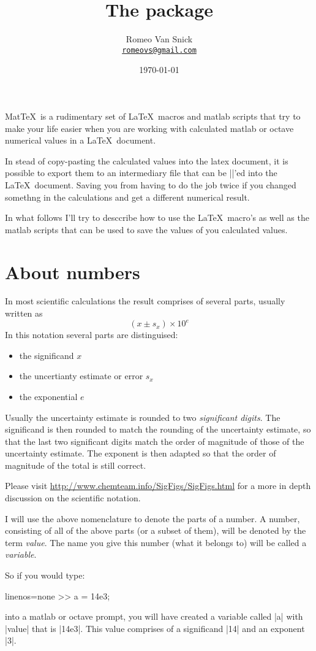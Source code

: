 \documentclass[a4paper,10pt]{article}
\author{Romeo Van Snick\\
\href{mailto:romeovs@gmail.com}{\nolinkurl{romeovs@gmail.com}}}
\date{\today}
\title{The \mt package}
\newcommand{\mt}{Mat\TeX\ }
\begin{document}
\maketitle

\mt is a rudimentary set of \LaTeX\ macros and matlab scripts that try to make your life easier when you are working with calculated matlab or octave numerical values in a \LaTeX\ document.

In stead of copy-pasting the calculated values into the latex document, it is possible to export them to an intermediary file that can be ||'ed into the \LaTeX\ document. Saving you from having to do the job twice if you changed somethng in the calculations and get a different numerical result.

In what follows I'll try to desccribe how to use the \LaTeX\ macro's as well as the matlab scripts that can be used to save the values of you calculated values.


\section{About numbers}
In most scientific calculations the result comprises of several parts, usually written as
\[ 
	(x \pm s_x) \times 10 ^{e}
\]
In this notation several parts are distinguised:
\begin{itemize}
	\item the significand \( x \)
	\item the uncertianty estimate or error \( s_x \)
	\item the exponential \( e \)
\end{itemize}
Usually the uncertainty estimate is rounded to two \emph{significant digits}. The significand is then rounded to match the rounding of the uncertainty estimate, so that the last two significant digits match the order of magnitude of those of the uncertainty estimate. The exponent is then adapted so that the order of magnitude of the total is still correct. 

Please visit \url{http://www.chemteam.info/SigFigs/SigFigs.html} for a more in depth discussion on the scientific notation.

I will use the above nomenclature to denote the parts of a number. A number, consisting of all of the above parts (or a subset of them), will be denoted by the term \emph{value}. The name you give this number (what it belongs to) will be called a \emph{variable}. 

So if you would type:
\begin{center}
	\begin{matlabcode*}{linenos=none}
		>> a = 14e3;
	\end{matlabcode*}
\end{center}
into a matlab or octave prompt, you will have created a variable called |a| with |value| that is |14e3|. This value comprises of a significand |14| and an exponent |3|. 
\end{document}
